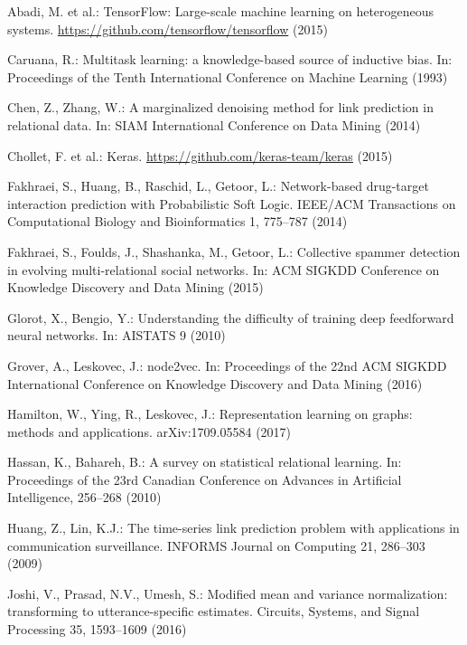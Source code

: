 \documentclass[letterpaper, conference]{IEEEtran}  %
\begin{document}
%
%
\begin{thebibliography}{99}
%
Abadi, M. et al.:
TensorFlow: Large-scale machine learning on heterogeneous systems.
\url{https://github.com/tensorflow/tensorflow} (2015)

Caruana, R.:
Multitask learning: a knowledge-based source of inductive bias.
In: Proceedings of the Tenth International Conference on Machine Learning (1993)

Chen, Z., Zhang, W.:
A marginalized denoising method for link prediction in relational data.
In: SIAM International Conference on Data Mining (2014)

Chollet, F. et al.:
Keras.
\url{https://github.com/keras-team/keras} (2015)

Fakhraei, S., Huang, B., Raschid, L., Getoor, L.:
Network-based drug-target interaction prediction with Probabilistic Soft Logic.
IEEE/ACM Transactions on Computational Biology and Bioinformatics 1, 775--787 (2014)

Fakhraei, S., Foulds, J., Shashanka, M., Getoor, L.:
Collective spammer detection in evolving multi-relational social networks.
In: ACM SIGKDD Conference on Knowledge Discovery and Data Mining (2015)

Glorot, X., Bengio, Y.:
Understanding the difficulty of training deep feedforward neural networks.
In: AISTATS 9 (2010)

Grover, A., Leskovec, J.:
node2vec.
In: Proceedings of the 22nd ACM SIGKDD International Conference on Knowledge Discovery and Data Mining (2016)

Hamilton, W., Ying, R., Leskovec, J.:
Representation learning on graphs: methods and applications.
arXiv:1709.05584 (2017)

Hassan, K., Bahareh, B.:
A survey on statistical relational learning.
In: Proceedings of the 23rd Canadian Conference on Advances in Artificial Intelligence, 256--268 (2010)

Huang, Z., Lin, K.J.:
The time-series link prediction problem with applications in communication surveillance.
INFORMS Journal on Computing 21, 286--303 (2009)

Joshi, V., Prasad, N.V., Umesh, S.:
Modified mean and variance normalization: transforming to utterance-specific estimates.
Circuits, Systems, and Signal Processing 35, 1593--1609 (2016)


\end{thebibliography}
\end{document}
